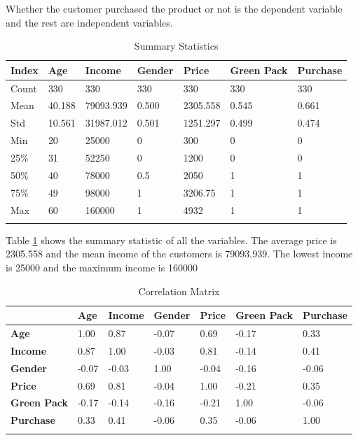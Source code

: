 \documentclass[a4paper,10pt]{article}
\begin{document}
Whether the customer purchased the product or not is the dependent variable and the rest are independent variables. 

\begin{table}[h]
\centering
\caption{Summary Statistics}
\begin{tabular}{|l|l|l|l|l|l|l|}
\hline
\textbf{Index} & \textbf{Age} & \textbf{Income} & \textbf{Gender} & \textbf{Price} & \textbf{Green Pack} & \textbf{Purchase} \\
\hline
Count & 330 & 330 & 330 & 330 & 330 & 330 \\
\hline
Mean & 40.188 & 79093.939 & 0.500 & 2305.558 & 0.545 & 0.661 \\
\hline
Std & 10.561 & 31987.012 & 0.501 & 1251.297 & 0.499 & 0.474 \\
\hline
Min & 20 & 25000 & 0 & 300 & 0 & 0 \\
\hline
25\% & 31 & 52250 & 0 & 1200 & 0 & 0 \\
\hline
50\% & 40 & 78000 & 0.5 & 2050 & 1 & 1 \\
\hline
75\% & 49 & 98000 & 1 & 3206.75 & 1 & 1 \\
\hline
Max & 60 & 160000 & 1 & 4932 & 1 & 1 \\
\hline
\label{summary_statistic}
\end{tabular}
\end{table}

Table \ref{summary_statistic} shows the summary statistic of all the variables. The average price is  2305.558 and the mean income of the customers is 79093.939. The lowest income is 25000 and the maximum income is 160000



\begin{table}[h]
\centering
\caption{Correlation Matrix}
\begin{tabular}{|l|l|l|l|l|l|l|}
\hline
 & \textbf{Age} & \textbf{Income} & \textbf{Gender} & \textbf{Price} & \textbf{Green Pack} & \textbf{Purchase} \\
\hline
\textbf{Age} & 1.00 & 0.87 & -0.07 & 0.69 & -0.17 & 0.33 \\
\hline
\textbf{Income} & 0.87 & 1.00 & -0.03 & 0.81 & -0.14 & 0.41 \\
\hline
\textbf{Gender} & -0.07 & -0.03 & 1.00 & -0.04 & -0.16 & -0.06 \\
\hline
\textbf{Price} & 0.69 & 0.81 & -0.04 & 1.00 & -0.21 & 0.35 \\
\hline
\textbf{Green Pack} & -0.17 & -0.14 & -0.16 & -0.21 & 1.00 & -0.06 \\
\hline
\textbf{Purchase} & 0.33 & 0.41 & -0.06 & 0.35 & -0.06 & 1.00 \\
\hline
\label{Correlation_matrix}
\end{tabular}
\end{table}
\end{document}
